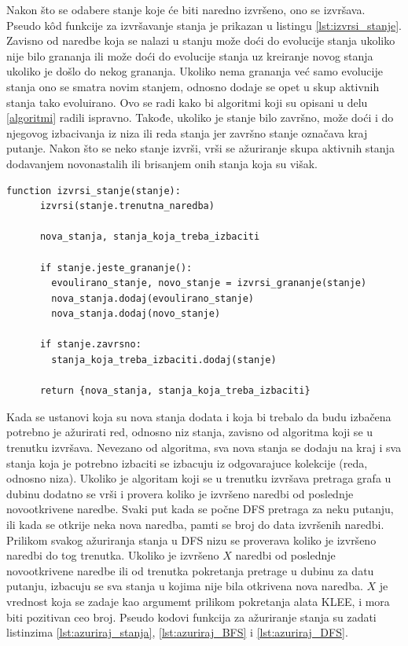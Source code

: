 \documentclass[12pt,oneside]{memoir}
\begin{document}
Nakon što se odabere stanje koje će biti naredno izvršeno, ono se izvršava. Pseudo k\^od funkcije za izvršavanje stanja je prikazan u listingu \ref{lst:izvrsi_stanje}. Zavisno od naredbe koja se nalazi u stanju može doći do evolucije stanja ukoliko nije bilo grananja ili može doći do evolucije stanja uz kreiranje novog stanja ukoliko je došlo do nekog grananja. Ukoliko nema grananja već samo evolucije stanja ono se smatra novim stanjem, odnosno dodaje se opet u skup aktivnih stanja tako evoluirano. Ovo se radi kako bi algoritmi koji su opisani u delu \ref{algoritmi} radili ispravno. Takođe, ukoliko je stanje bilo završno, može doći i do njegovog izbacivanja iz niza ili reda stanja jer završno stanje označava kraj putanje. Nakon što se neko stanje izvrši, vrši se ažuriranje skupa aktivnih stanja dodavanjem novonastalih ili brisanjem onih stanja koja su višak.

    \begin{lstlisting}[caption={Pseudokod funkcije koja izvrsava stanje},captionpos=b,label={lst:izvrsi_stanje}]
    function izvrsi_stanje(stanje):
      izvrsi(stanje.trenutna_naredba)
      
      nova_stanja, stanja_koja_treba_izbaciti
      
      if stanje.jeste_grananje():
        evoulirano_stanje, novo_stanje = izvrsi_grananje(stanje)
        nova_stanja.dodaj(evoulirano_stanje)
        nova_stanja.dodaj(novo_stanje)
      
      if stanje.zavrsno:
        stanja_koja_treba_izbaciti.dodaj(stanje)
        
      return {nova_stanja, stanja_koja_treba_izbaciti}
    \end{lstlisting}
    
Kada se ustanovi koja su nova stanja dodata i koja bi trebalo da budu izbačena potrebno je ažurirati red, odnosno niz stanja, zavisno od algoritma koji se u trenutku izvršava. Nevezano od algoritma, sva nova stanja se dodaju na kraj i sva stanja koja je potrebno izbaciti se izbacuju iz odgovarajuce kolekcije (reda, odnosno niza). Ukoliko je algoritam koji se u trenutku izvršava pretraga grafa u dubinu dodatno se vrši i provera koliko je izvršeno naredbi od poslednje novootkrivene naredbe. Svaki put kada se počne DFS pretraga za neku putanju, ili kada se otkrije neka nova naredba, pamti se broj do data izvršenih naredbi. Prilikom svakog ažuriranja stanja u DFS nizu se proverava koliko je izvršeno naredbi do tog trenutka. Ukoliko je izvršeno $X$ naredbi od poslednje novootkrivene naredbe ili od trenutka pokretanja pretrage u dubinu za datu putanju, izbacuju se sva stanja u kojima nije bila otkrivena nova naredba. $X$ je vrednost koja se zadaje kao argumemt prilikom pokretanja alata KLEE, i mora biti pozitivan ceo broj. Pseudo kodovi funkcija za ažuriranje stanja su zadati listinzima \ref{lst:azuriraj_stanja}, \ref{lst:azuriraj_BFS} i \ref{lst:azuriraj_DFS}.
\end{document}
